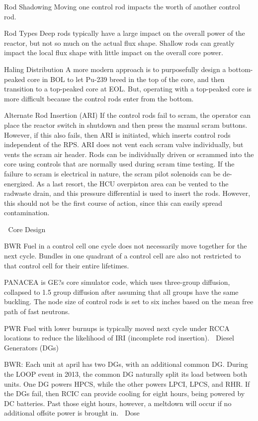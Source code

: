 \documentclass[10pt]{article}
\begin{document}
Rod Shadowing
Moving one control rod impacts the worth of another control rod. 

Rod Types
Deep rods typically have a large impact on the overall power of the reactor, but not so much on the actual flux shape. Shallow rods can greatly impact the local flux shape with little impact on the overall core power. 

Haling Distribution
A more modern approach is to purposefully design a bottom-peaked core in BOL to let Pu-239 breed in the top of the core, and then transition to a top-peaked core at EOL. But, operating with a top-peaked core is more difficult because the control rods enter from the bottom. 

Alternate Rod Insertion (ARI)
If the control rods fail to scram, the operator can place the reactor switch in shutdown and then press the manual scram buttons. However, if this also fails, then ARI is initiated, which inserts control rods independent of the RPS. ARI does not vent each scram valve individually, but vents the scram air header. Rods can be individually driven or scrammed into the core using controls that are normally used during scram time testing. If the failure to scram is electrical in nature, the scram pilot solenoids can be de-energized. As a last resort, the HCU overpiston area can be vented to the radwaste drain, and this pressure differential is used to insert the rods. However, this should not be the first course of action, since this can easily spread contamination. 


Core Design

BWR
Fuel in a control cell one cycle does not necessarily move together for the next cycle. Bundles in one quadrant of a control cell are also not restricted to that control cell for their entire lifetimes. 

PANACEA is GE?s core simulator code, which uses three-group diffusion, collapsed to 1.5 group diffusion after assuming that all groups have the same buckling. The node size of control rods  is set to six inches based on the mean free path of fast neutrons. 

PWR
Fuel with lower burnups is typically moved next cycle under RCCA locations to reduce the likelihood of IRI (incomplete rod insertion). 
Diesel Generators (DGs)


BWR: Each unit at april has two DGs, with an additional common DG. During the LOOP event in 2013, the common DG naturally split its load between both units. One DG powers HPCS, while the other powers LPCI, LPCS, and RHR. If the DGs fail, then RCIC can provide cooling for eight hours, being powered by DC batteries. Past those eight hours, however, a meltdown will occur if no additional offsite power is brought in. 

Dose
\end{document}
